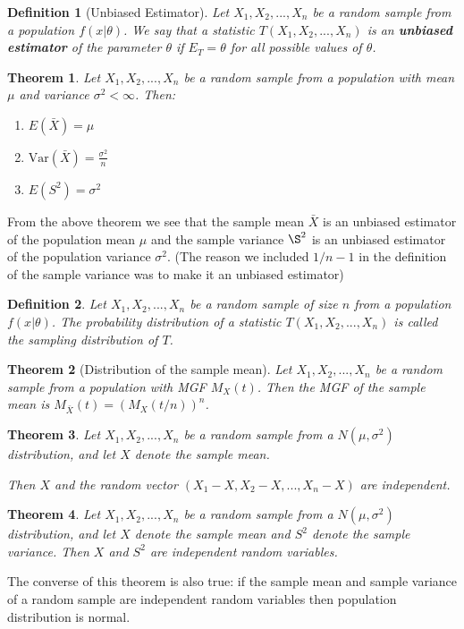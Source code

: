 \documentclass[12pt,twoside]{report}
\newtheorem{defn}{Definition}
\newtheorem{thm}{Theorem}
\begin{document}
\begin{defn}[Unbiased Estimator]
    Let $X_1, X_2, ..., X_n$ be a random sample from a population $f\left (x| \theta\right )$. We say that a statistic $T\left (X_1, X_2, ...,X_n\right )$ is an \textbf{unbiased estimator} of the parameter $\theta$ if $E_T = \theta$ for all possible values of $\theta$.
\end{defn}

\begin{thm}
    Let $X_1, X_2, ..., X_n$ be a random sample from a population with mean $\mu $ and variance $\sigma ^2 < \infty$. Then:
    \begin{enumerate}
        \item $E\left (\bar{X}\right ) = \mu $
        \item $\text{Var}\left (\bar{X}\right ) = \frac{\sigma ^2}{n}$
        \item $E\left (S ^2\right ) = \sigma ^2$
    \end{enumerate}
\end{thm}

From the above theorem we see that the sample mean $\bar{X}$ is an unbiased estimator of the population mean $\mu$ and the sample variance $\S^2$ is an unbiased estimator of the population variance $\sigma^2$. (The reason we included $1/n-1$ in the  definition of the sample variance was to make it an unbiased estimator)

\begin{defn}
    Let $X_1, X_2, ..., X_n$ be a random sample of size $n$ from a population $f(x|\theta)$. The probability distribution of a statistic $T(X_1, X_2, ..., X_n)$ is called the sampling distribution of $T$.
\end{defn}

\begin{thm}[Distribution of the sample mean]
    Let $X_1, X_2, ..., X_n$ be a random sample from a population with MGF $M_X(t)$. Then the MGF of the sample mean is $M_{\bar{X}} (t) = (M_X (t/n))^n$.
\end{thm}

\begin{thm}
    Let $X_1, X_2, . . . , X_n$ be a random sample from a $N(\mu, \sigma^2)$ distribution, and let $X$ denote the sample mean.

    Then $X$ and the random vector $(X_1 - X, X_2 - X, . . . , X_n - X)$ are independent.
\end{thm}

\begin{thm}
    Let $X_1, X_2, . . . , X_n$ be a random sample from a $N(\mu, \sigma^2)$ distribution, 
    and let $X$ denote the sample mean and $S^2$ denote the sample variance. Then $X$ and $S^2$ are independent random variables.
\end{thm}
The converse of this theorem is also true: if the sample mean and sample variance of a random sample are independent random variables then population distribution is normal.
\end{document}
